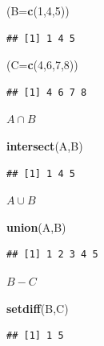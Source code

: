 \documentclass[]{book}
\newenvironment{Shaded}{\begin{snugshade}}{\end{snugshade}}
\newcommand{\DataTypeTok}[1]{\textcolor[rgb]{0.13,0.29,0.53}{#1}}
\newcommand{\DecValTok}[1]{\textcolor[rgb]{0.00,0.00,0.81}{#1}}
\newcommand{\KeywordTok}[1]{\textcolor[rgb]{0.13,0.29,0.53}{\textbf{#1}}}
\newcommand{\NormalTok}[1]{#1}
\begin{document}
\begin{Shaded}
\begin{Highlighting}[]
\NormalTok{(}\DataTypeTok{B=}\KeywordTok{c}\NormalTok{(}\DecValTok{1}\NormalTok{,}\DecValTok{4}\NormalTok{,}\DecValTok{5}\NormalTok{))}
\end{Highlighting}
\end{Shaded}

\begin{verbatim}
## [1] 1 4 5
\end{verbatim}

\begin{Shaded}
\begin{Highlighting}[]
\NormalTok{(}\DataTypeTok{C=}\KeywordTok{c}\NormalTok{(}\DecValTok{4}\NormalTok{,}\DecValTok{6}\NormalTok{,}\DecValTok{7}\NormalTok{,}\DecValTok{8}\NormalTok{))}
\end{Highlighting}
\end{Shaded}

\begin{verbatim}
## [1] 4 6 7 8
\end{verbatim}

\(A\cap B\)

\begin{Shaded}
\begin{Highlighting}[]
\KeywordTok{intersect}\NormalTok{(A,B)}
\end{Highlighting}
\end{Shaded}

\begin{verbatim}
## [1] 1 4 5
\end{verbatim}

\(A\cup B\)

\begin{Shaded}
\begin{Highlighting}[]
\KeywordTok{union}\NormalTok{(A,B)}
\end{Highlighting}
\end{Shaded}

\begin{verbatim}
## [1] 1 2 3 4 5
\end{verbatim}

\(B-C\)

\begin{Shaded}
\begin{Highlighting}[]
\KeywordTok{setdiff}\NormalTok{(B,C)}
\end{Highlighting}
\end{Shaded}

\begin{verbatim}
## [1] 1 5
\end{verbatim}
\end{document}
